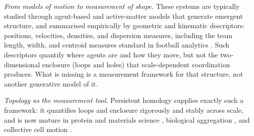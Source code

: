 \textit{From models of motion to measurement of shape.} These systems are typically studied through agent-based and active-matter models that generate emergent structure, and summarised empirically by geometric and kinematic descriptors: positions, velocities, densities, and dispersion measures, including the team length, width, and centroid measures standard in football analytics \citep{Folgado2014, Gudmundsson2017, FernandezBornn2018}. Such descriptors quantify where agents are and how they move, but not the two-dimensional enclosure (loops and holes) that scale-dependent coordination produces. What is missing is a measurement framework for that structure, not another generative model of it.

\textit{Topology as the measurement tool.} Persistent homology supplies exactly such a framework: it quantifies loops and enclosure rigorously and stably across scale, and is now mature in protein and materials science \citep{Xia2014, Hiraoka2016}, biological aggregation \citep{Topaz2015}, and collective cell motion \citep{Bhaskar2019}.

